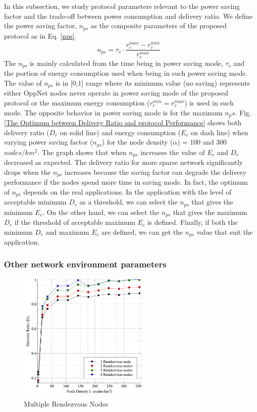 \documentclass[conference]{IEEEtran}
\begin{document}
In this subsection, we study protocol parameters relevant to the power saving factor and the trade-off between power consumption and delivery ratio.
%
We define the power saving factor, $n_{ps}$ as the composite parameters of the proposed protocol as in Eq. \ref{nps}.
%
\begin{equation}
{ n }_{ ps }={ \tau  }_{ s }\cdot \frac { { r }_{ c }^{ max }-{ r }_{ c }^{ min } }{ { r }_{ c }^{ max } } 
\label{nps}
\end{equation}
The $n_{ps}$ is mainly calculated from the time being in power saving mode, $\tau_s$ and the portion of energy consumption used when being in such power saving mode.
%
The value of $n_{ps}$ is in [0,1] range where its minimum value (no saving) represents either OppNet nodes never operate in power saving mode of the proposed protocol or the maximum energy consumption ($r_c^{min} = r_c^{max}$) is used in such mode.
%
The opposite behavior in power saving mode is for the maximum $n_ps$.
%
Fig. \ref{The Optimum between Delivery Ratio and protocol Performance} shows both delivery ratio ($D_r$ on solid line) and energy consumption ($E_c$ on dash line) when varying power saving factor ($n_{ps}$) for the node density ($\alpha$) = 100 and 300 $nodes/km^2$.
%
The graph shows that when $n_{ps}$ increases the value of $E_c$ and $D_r$ decreased as expected.
%
The delivery ratio for more sparse network significantly drops when the $n_{ps}$ increases because the saving factor can degrade the delivery performance if the nodes spend more time in saving mode.
%
In fact, the optimum of $n_{ps}$ depends on the real applications.
%
In the application with the level of acceptable minimum $D_r$ as a threshold, we can select the $n_{ps}$ that gives the minimum $E_c$.
%
On the other hand, we can select the $n_{ps}$ that gives the maximum $D_r$ if the threshold of acceptable maximum $E_c$ is defined.
%
Finally, if both the minimum $D_r$ and maximum $E_c$ are defined, we can get the $n_{ps}$ value that suit the application.


\subsubsection{Other network environment parameters}

\begin{figure}[!t]
	\centering
	\includegraphics[width=2.5in]{Graphs/MultipleRVs.pdf}
	\caption{Multiple Rendezvous Nodes}
	\label{Multiple Rendezvous Nodes}
\end{figure}
\end{document}

